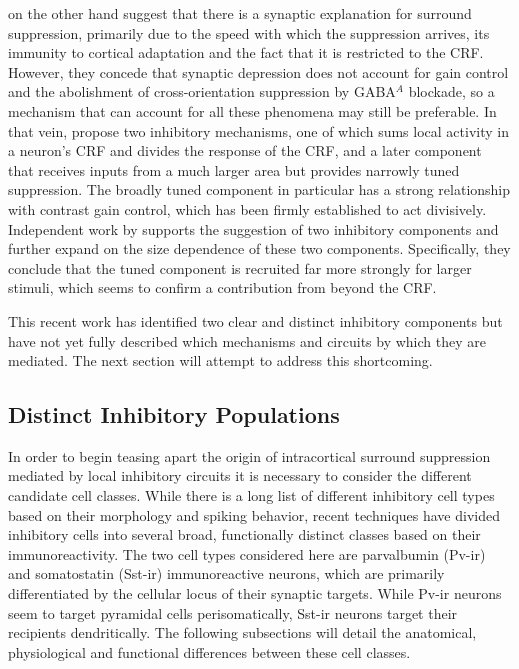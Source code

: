 \cite{Carandini2002} on the other
hand suggest that there is a synaptic explanation for surround
suppression, primarily due to the speed with which the suppression
arrives, its immunity to cortical adaptation and the fact that it is
restricted to the CRF. However, they concede that synaptic depression
does not account for gain control and the abolishment of
cross-orientation suppression by GABA$^{A}$ blockade, so a mechanism
that can account for all these phenomena may still be preferable. In
that vein, \cite{Webb2005} propose two inhibitory mechanisms, one of
which sums local activity in a neuron's CRF and divides the response of
the CRF, and a later component that receives inputs from a much
larger area but provides narrowly tuned suppression. The broadly tuned
component in particular has a strong relationship with contrast gain
control, which has been firmly established to act
divisively. Independent work by \cite{Xing2005} supports the
suggestion of two inhibitory components and further expand on the size
dependence of these two components. Specifically, they conclude that
the tuned component is recruited far more strongly for larger stimuli,
which seems to confirm a contribution from beyond the CRF.

This recent work has identified two clear and distinct inhibitory
components but have not yet fully described which mechanisms and
circuits by which they are mediated.  The next section will attempt to
address this shortcoming.

\subsection{Distinct Inhibitory Populations} \label{InhibitoryBackground}

In order to begin teasing apart the origin of intracortical surround
suppression mediated by local inhibitory circuits it is necessary to
consider the different candidate cell classes. While there is a long
list of different inhibitory cell types based on their morphology and
spiking behavior, recent techniques have divided inhibitory cells into
several broad, functionally distinct classes based on their
immunoreactivity. The two cell types considered here are parvalbumin
(Pv-ir) and somatostatin (Sst-ir) immunoreactive neurons, which are
primarily differentiated by the cellular locus of their synaptic
targets. While Pv-ir neurons seem to target pyramidal cells
perisomatically, Sst-ir neurons target their recipients
dendritically. The following subsections will detail the anatomical,
physiological and functional differences between these cell classes.

